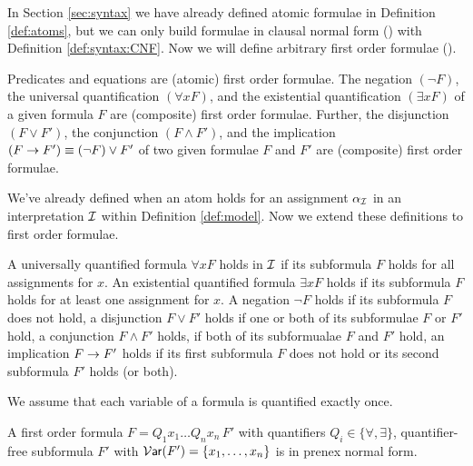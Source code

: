 In Section \ref{sec:syntax} we have already defined atomic formulae in Definition \ref{def:atoms}, 
but we can only build formulae in clausal normal form (\CNF) with Definition \vref{def:syntax:CNF}.
Now we will define arbitrary first order formulae (\FOF).

\begin{definition}[\FOF]\label{def:syntax:FOF}
	Predicates and equations are (atomic) first order formulae. 
	The negation $(\lnot F)$, 
	the universal quantification $(\forall x F)$, 
	and the existential quantification $(\exists x F)$ 
	of a given formula $F$ are (composite) first order formulae.
	Further, the disjunction $(F \lor F')$, 
	the conjunction $(F \land F') $, 
	and the implication $(F \rightarrow F') \equiv (\lnot F) \lor F'$ 
	of two given formulae $F$ and $F'$ 
	are (composite) first order formulae.
\end{definition}

We've already defined when an atom holds for an assignment $\alpha_{\mathcal I}$ 
in an interpretation ${\mathcal I}$ within Definition \vref{def:model}.
Now we extend these definitions to first order formulae.

\begin{definition}\label{def:semantics:FOF}
	
	A universally quantified formula $\forall x F$ holds in ${\mathcal I}$ if its subformula $F$ holds for all assignments for $x$.
	An existential quantified formula $\exists xF$ holds if its subformula $F$ holds for at least one assignment for $x$.
	A negation $\lnot F$ holds if its subformula $F$ does not hold, 
	a disjunction $F\lor F'$ holds if one or both of its subformulae $F$ or $F'$ hold,
	a conjunction $F\land F'$ holds, if both of its subformualae $F$ and $F'$ hold, 
	an implication $F\rightarrow F'$ holds if its first subformula $F$ does not hold or its second subformula $F'$ holds (or both).
\end{definition}

\noindent We assume that each variable of a formula is quantified exactly once.

\begin{definition}\label{def:syntax:PNF}
	A first order formula $F = Q_1 x_1 \ldots Q_n x_n\, F'$ 
	with quantifiers $Q_i\in\{\forall,\exists\}$, 
	quantifier-free subformula $F'$ with $\operatorname{\mathcal{V}\mathsf{ar}}(F') = \{ x_1,\ldots,x_n \}$
	is in {\myem prenex normal form}.
\end{definition}

